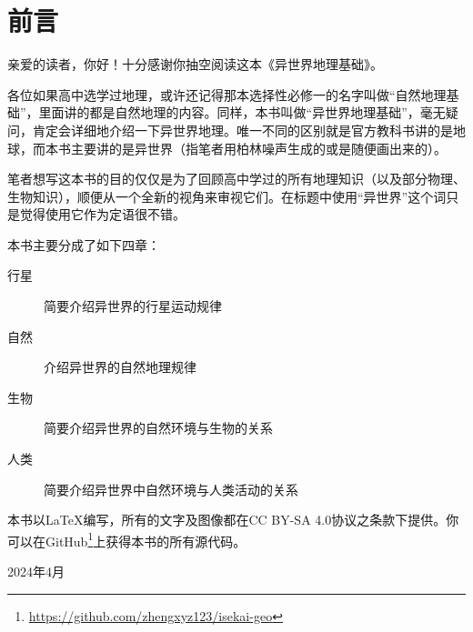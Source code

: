 \section*{前言}
亲爱的读者，你好！十分感谢你抽空阅读这本《异世界地理基础》。

各位如果高中选学过地理，或许还记得那本选择性必修一的名字叫做“自然地理基础”，里面讲的都是自然地理的内容。同样，本书叫做“异世界地理基础”，毫无疑问，肯定会详细地介绍一下异世界地理。唯一不同的区别就是官方教科书讲的是地球，而本书主要讲的是异世界（指笔者用柏林噪声生成的或是随便画出来的）。

笔者想写这本书的目的仅仅是为了回顾高中学过的所有地理知识（以及部分物理、生物知识），顺便从一个全新的视角来审视它们。在标题中使用“异世界”这个词只是觉得使用它作为定语很不错。

本书主要分成了如下四章：
\begin{description}
    \item[行星] 简要介绍异世界的行星运动规律
    \item[自然] 介绍异世界的自然地理规律
    \item[生物] 简要介绍异世界的自然环境与生物的关系
    \item[人类] 简要介绍异世界中自然环境与人类活动的关系
\end{description}

本书以\LaTeX 编写，所有的文字及图像都在CC BY-SA 4.0协议之条款下提供。你可以在GitHub\footnote{\url{https://github.com/zhengxyz123/isekai-geo}}上获得本书的所有源代码。

\begin{flushright}
    2024年4月
\end{flushright}
